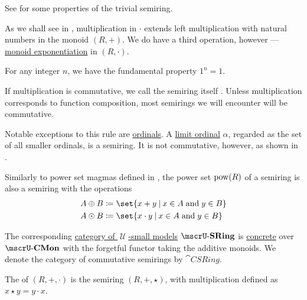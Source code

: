 \begin{definition}
\begin{thmenum}
    See  for some properties of the trivial semiring.

     As we shall see in , multiplication in \( \cdot \) extends left multiplication with natural numbers in the monoid \( (R, +) \). We do have a third operation, however --- \hyperref[def:monoid/exponentiation]{monoid exponentiation} in \( (R, \cdot) \).

    For any integer \( n \), we have the fundamental property \( 1^n = 1 \).

     If multiplication is commutative, we call the semiring itself . Unless multiplication corresponds to function composition, most semirings we will encounter will be commutative.

    Notable exceptions to this rule are \hyperref[def:ordinal]{ordinals}. A \hyperref[def:successor_and_limit_ordinal]{limit ordinal} \( \alpha \), regarded as the set of all smaller ordinals, is a semiring. It is not commutative, however, as shown in .

     Similarly to power set magmas defined in , the power set \( \operatorname{pow}(R) \) of a semiring is also a semiring with the operations
    \begin{align*}
      A \oplus B &\coloneqq \set{ x + y \given x \in A \T{and} y \in B } \\
      A \odot B  &\coloneqq \set{ x \cdot y \given x \in A \T{and} y \in B }
    \end{align*}

     The corresponding \hyperref[def:category_of_small_first_order_models]{category of \( \mscrU \)-small models} \( \ucat{SRing} \) is \hyperref[def:concrete_category]{concrete} over \hyperref[def:monoid]{\( \ucat{CMon} \)} with the forgetful functor taking the additive monoids. We denote the category of commutative semirings by \( \cat{CSRing} \).

     The  of \( (R, +, \cdot) \) is the semiring \( (R, +, \star) \), with multiplication defined as \( x \star y = y \cdot x \).
  \end{thmenum}
\end{definition}

